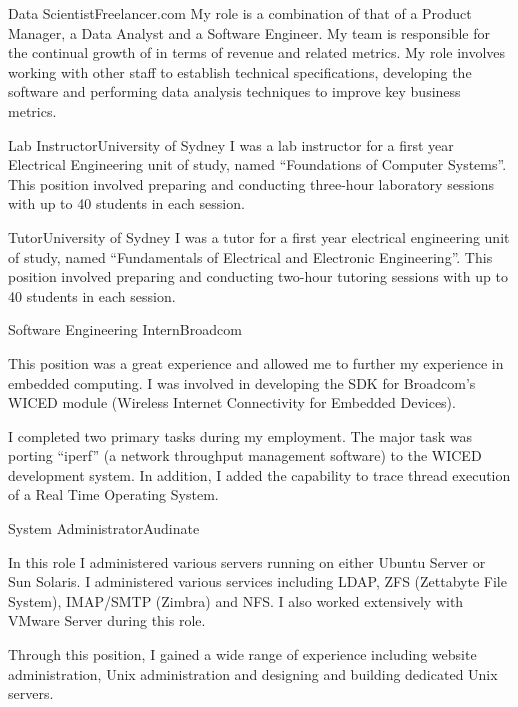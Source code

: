 \begin{professionalExperience}

{Data Scientist}{Freelancer.com}
{My role is a combination of that of a Product Manager, a Data Analyst and a
Software Engineer. My team is responsible for the continual growth of
 in terms of revenue and related metrics. My role
involves working with other staff to establish technical specifications,
developing the software and performing data analysis techniques to improve key
business metrics.}

{Lab Instructor}{University of Sydney}
{I was a lab instructor for a first year Electrical Engineering unit of study,
named ``Foundations of Computer Systems''. This position involved preparing
and conducting three-hour laboratory sessions with up to 40 students in each
session.}

{Tutor}{University of Sydney}
{I was a tutor for a first year electrical engineering unit of study, named
``Fundamentals of Electrical and Electronic Engineering''. This position
involved preparing and conducting two-hour tutoring sessions with up to 40
students in each session.}

{Software Engineering Intern}{Broadcom}
{This position was a great experience and allowed me to further my experience in
embedded computing. I was involved in developing the SDK for Broadcom's WICED
module (Wireless Internet Connectivity for Embedded Devices).

I completed two primary tasks during my employment. The major task was porting
``iperf'' (a network throughput management software) to the WICED development
system. In addition, I added the capability to trace thread execution of a Real
Time Operating System.}

{System Administrator}{Audinate}
{In this role I administered various servers running on either Ubuntu Server or
Sun Solaris. I administered various services including LDAP, ZFS (Zettabyte File
System), IMAP/SMTP (Zimbra) and NFS. I also worked extensively with VMware
Server during this role.

Through this position, I gained a wide range of experience including website
administration, Unix administration and designing and building dedicated Unix
servers.}


\end{professionalExperience}

